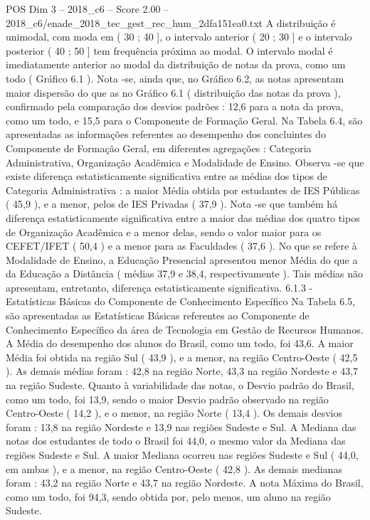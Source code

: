 \begin{textsample}{POS Dim 3 – 2018\_c6 – Score 2.00 – 2018\_c6/enade\_2018\_tec\_gest\_rec\_hum\_2dfa151ea0.txt}
A distribuição é unimodal, com moda em ( 30 ; 40 ], o intervalo anterior ( 20 ; 30 ] e o intervalo posterior ( 40 ; 50 ] tem frequência próxima ao modal.
O intervalo modal é imediatamente anterior ao modal da distribuição de notas da prova, como um todo ( Gráfico 6.1 ).
Nota -se, ainda que, no Gráfico 6.2, as notas apresentam maior dispersão do que as no Gráfico 6.1 ( distribuição das notas da prova ), confirmado pela comparação dos desvios padrões : 12,6 para a nota da prova, como um todo, e 15,5 para o Componente de Formação Geral.
Na Tabela 6.4, são apresentadas as informações referentes ao desempenho dos concluintes do Componente de Formação Geral, em diferentes agregações : Categoria Administrativa, Organização Acadêmica e Modalidade de Ensino.
Observa -se que existe diferença estatisticamente significativa entre as médias dos tipos de Categoria Administrativa : a maior Média obtida por estudantes de IES Públicas ( 45,9 ), e a menor, pelos de IES Privadas ( 37,9 ).
Nota -se que também há diferença estatisticamente significativa entre a maior das médias dos quatro tipos de Organização Acadêmica e a menor delas, sendo o valor maior para os CEFET/IFET ( 50,4 ) e a menor para as Faculdades ( 37,6 ).
No que se refere à Modalidade de Ensino, a Educação Presencial apresentou menor Média do que a da Educação a Distância ( médias 37,9 e 38,4, respectivamente ).
Tais médias não apresentam, entretanto, diferença estatisticamente significativa. 6.1.3 - Estatísticas Básicas do Componente de Conhecimento Específico Na Tabela 6.5, são apresentadas as Estatísticas Básicas referentes ao Componente de Conhecimento Específico da área de Tecnologia em Gestão de Recursos Humanos.
A Média do desempenho dos alunos do Brasil, como um todo, foi 43,6.
A maior Média foi obtida na região Sul ( 43,9 ), e a menor, na região Centro-Oeste ( 42,5 ).
As demais médias foram : 42,8 na região Norte, 43,3 na região Nordeste e 43,7 na região Sudeste.
Quanto à variabilidade das notas, o Desvio padrão do Brasil, como um todo, foi 13,9, sendo o maior Desvio padrão observado na região Centro-Oeste ( 14,2 ), e o menor, na região Norte ( 13,4 ).
Os demais desvios foram : 13,8 na região Nordeste e 13,9 nas regiões Sudeste e Sul.
A Mediana das notas dos estudantes de todo o Brasil foi 44,0, o mesmo valor da Mediana das regiões Sudeste e Sul.
A maior Mediana ocorreu nas regiões Sudeste e Sul ( 44,0, em ambas ), e a menor, na região Centro-Oeste ( 42,8 ).
As demais medianas foram : 43,2 na região Norte e 43,7 na região Nordeste.
A nota Máxima do Brasil, como um todo, foi 94,3, sendo obtida por, pelo menos, um aluno na região Sudeste.

\end{textsample}

